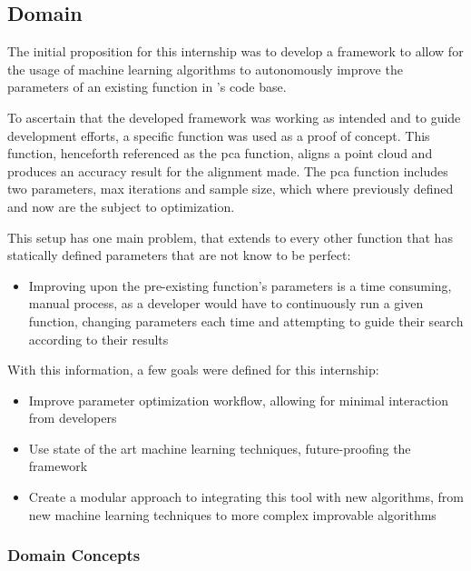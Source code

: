 
\subsection{Domain}

The initial proposition for this internship was to develop a framework to allow for the usage of machine learning algorithms to autonomously improve the parameters of an existing function in \faro's code base.

To ascertain that the developed framework was working as intended and to guide development efforts, a specific function was used as a proof of concept. This function, henceforth referenced as the \acrfull{pca} function, aligns a point cloud and produces an accuracy result for the alignment made. The \acrshort{pca} function includes two parameters, max iterations and sample size, which where previously defined and now are the subject to optimization.

This setup has one main problem, that extends to every other function that has statically defined parameters that are not know to be perfect:

\begin{itemize}
	\item Improving upon the pre-existing function's parameters is a time consuming, manual process, as a developer would have to continuously run a given function, changing parameters each time and attempting to guide their search according to their results
\end{itemize}

With this information, a few goals were defined for this internship:

\begin{itemize}
	\item Improve parameter optimization workflow, allowing for minimal interaction from developers
	\item Use state of the art machine learning techniques, future-proofing the framework
	\item Create a modular approach to integrating this tool with new algorithms, from new machine learning techniques to more complex improvable algorithms
\end{itemize}

\subsubsection{Domain Concepts}

